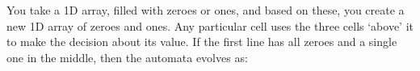 You take a 1D array, filled with zeroes or ones,
and based on these, you create a new 1D array of
zeroes and ones. Any particular cell uses the three
cells `above' it to make the decision about its
value. If the first line has all zeroes
and a single one in the middle, then the automata evolves as:
\begin{figure}[ht]
\centering
{}
\end{figure}
